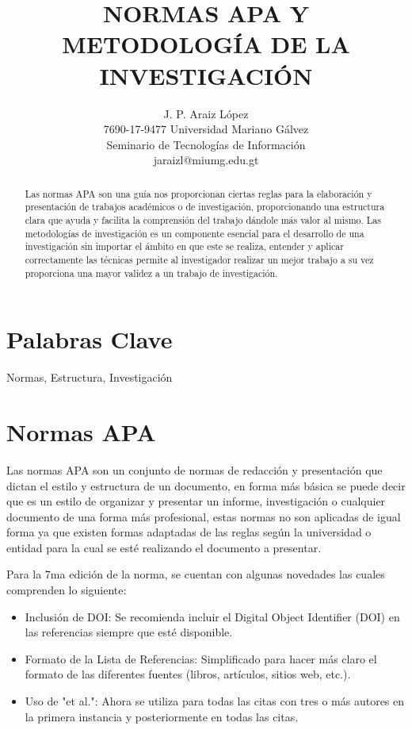 \documentclass[12pt]{article}
\title{NORMAS APA Y METODOLOGÍA DE LA INVESTIGACIÓN}
\author{J. P. Araiz López\\
  \small 7690-17-9477 Universidad Mariano Gálvez\\
  \small Seminario de Tecnologías de Información\\
  \small jaraizl@miumg.edu.gt
}
\begin{document}
\maketitle

\begin{abstract}
Las normas APA son una guía nos proporcionan ciertas reglas para la elaboración y presentación de trabajos académicos o de investigación, proporcionando una estructura clara que ayuda y facilita la comprensión del trabajo dándole más valor al mismo.
Las metodologías de investigación es un componente esencial para el desarrollo de una investigación sin importar el ámbito en que este se realiza, entender y aplicar correctamente las técnicas permite al investigador realizar un mejor trabajo a su vez proporciona una mayor validez a un trabajo de investigación. 

\end{abstract}
\maketitle{}


\section*{Palabras Clave}
Normas, Estructura, Investigación

\section*{Normas APA}

Las normas APA son un conjunto de normas de redacción y presentación que dictan el estilo y estructura de un documento, en forma más básica se puede decir que es un estilo de organizar y presentar un informe, investigación o cualquier documento de una forma más profesional, estas normas no son aplicadas de igual forma ya que existen formas adaptadas de las reglas según la universidad o entidad para la cual se esté realizando el documento a presentar. 

Para la 7ma edición de la norma, se cuentan con algunas novedades las cuales comprenden lo siguiente:
\begin{itemize}
\item Inclusión de DOI: Se recomienda incluir el Digital Object Identifier (DOI) en las referencias siempre que esté disponible.
\item Formato de la Lista de Referencias: Simplificado para hacer más claro el formato de las diferentes fuentes (libros, artículos, sitios web, etc.).
\item Uso de "et al.": Ahora se utiliza para todas las citas con tres o más autores en la primera instancia y posteriormente en todas las citas.
\end{itemize}
\end{document}
